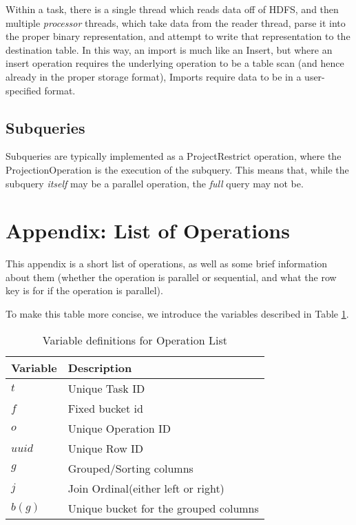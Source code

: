 Within a task, there is a single thread which reads data off of HDFS, and then multiple \emph{processor} threads, which take data from the reader thread, parse it into the proper binary representation, and attempt to write that representation to the destination table. In this way, an import is much like an Insert, but where an insert operation requires the underlying operation to be a table scan (and hence already in the proper storage format), Imports require data to be in a user-specified format.

\subsection{Subqueries}
Subqueries are typically implemented as a ProjectRestrict operation, where the ProjectionOperation is the execution of the subquery. This means that, while the subquery \emph{itself} may be a parallel operation, the \emph{full} query may not be.

\section{Appendix: List of Operations}
This appendix is a short list of operations, as well as some brief information about them (whether the operation is parallel or sequential, and what the row key is for \temp if the operation is parallel).

To make this table more concise, we introduce the variables described in Table \ref{tab:op-legend}.

\clearpage
\begin{table}
\begin{tabular}{|l|l|}
				\hline
				\bf{Variable}	&	\bf{Description}								\\	\hline
				$t$			&	Unique Task ID												\\	\hline
				$f$			&	Fixed bucket id												\\	\hline
				$o$			&	Unique Operation ID										\\	\hline
				$uuid$	&	Unique Row ID													\\	\hline
				$g$			& Grouped/Sorting columns								\\	\hline
				$j$			&	Join Ordinal(either left or right)		\\	\hline
				$b(g)$	& Unique bucket for the grouped columns	\\	\hline
\end{tabular}
\\
\caption{Variable definitions for Operation List}
\label{tab:op-legend}
\end{table}

